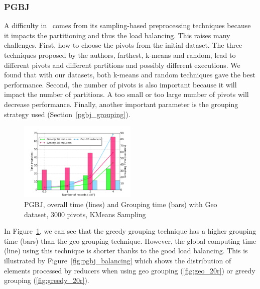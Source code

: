 \subsubsection{PGBJ} 
A difficulty in \VO~comes from its sampling-based preprocessing techniques because it 
impacts the partitioning and thus the load balancing. This raises many challenges. First, how to choose
the pivots from the initial dataset. The three techniques proposed by the authors, farthest, k-means and 
random, lead to different pivots and different partitions and possibly different executions. We found that 
with  our datasets, both k-means and random techniques
gave the best performance. Second, the number of pivots is also important because
it will impact the number of partitions. A too small or too large number of pivots 
will decrease performance. Finally, another important parameter is the grouping strategy used 
(Section~\ref{pgbj_grouping}).
\begin{figure}[!h]
   \includegraphics[width=0.5\textwidth]{img-perf/perso/pgbj/strategy.pdf} 
   \caption{PGBJ, overall time (lines) and Grouping time (bars)\label{fig:pgbj_strategy} with Geo dataset, 3000 pivots, 
   KMeans Sampling}         
\end{figure}
In Figure~\ref{fig:pgbj_strategy}, we can see that the greedy grouping technique has a higher grouping time 
(bars) than the geo grouping technique. 
However, the global computing time (line) using this technique is shorter thanks to the good load balancing. This
is illustrated by Figure~\ref{fig:pgbj_balancing} which shows the distribution of elements processed
by reducers when using geo grouping (\ref{fig:geo_20r}) or greedy grouping (\ref{fig:greedy_20r}).
                  
